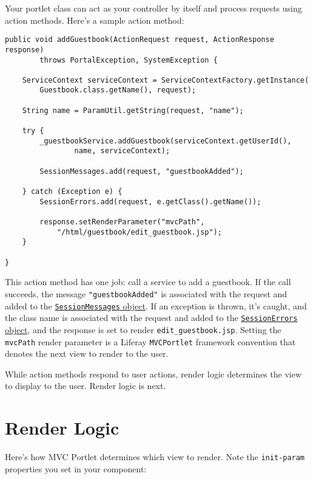 Your portlet class can act as your controller by itself and process
requests using action methods. Here's a sample action method:

\begin{verbatim}
public void addGuestbook(ActionRequest request, ActionResponse response)
        throws PortalException, SystemException {

    ServiceContext serviceContext = ServiceContextFactory.getInstance(
        Guestbook.class.getName(), request);

    String name = ParamUtil.getString(request, "name");

    try {
        _guestbookService.addGuestbook(serviceContext.getUserId(),
                name, serviceContext);

        SessionMessages.add(request, "guestbookAdded");

    } catch (Exception e) {
        SessionErrors.add(request, e.getClass().getName());

        response.setRenderParameter("mvcPath",
            "/html/guestbook/edit_guestbook.jsp");
    }

}
\end{verbatim}

This action method has one job: call a service to add a guestbook. If
the call succeeds, the message \texttt{"guestbookAdded"} is associated
with the request and added to the
\href{https://docs.liferay.com/dxp/portal/7.2-latest/javadocs/portal-kernel/com/liferay/portal/kernel/servlet/SessionMessages.html}{\texttt{SessionMessages}
object}. If an exception is thrown, it's caught, and the class name is
associated with the request and added to the
\href{https://docs.liferay.com/dxp/portal/7.2-latest/javadocs/portal-kernel/com/liferay/portal/kernel/servlet/SessionErrors.html}{\texttt{SessionErrors}
object}, and the response is set to render \texttt{edit\_guestbook.jsp}.
Setting the \texttt{mvcPath} render parameter is a Liferay
\texttt{MVCPortlet} framework convention that denotes the next view to
render to the user.

While action methods respond to user actions, render logic determines
the view to display to the user. Render logic is next.

\section{Render Logic}\label{render-logic}

Here's how MVC Portlet determines which view to render. Note the
\texttt{init-param} properties you set in your component:

